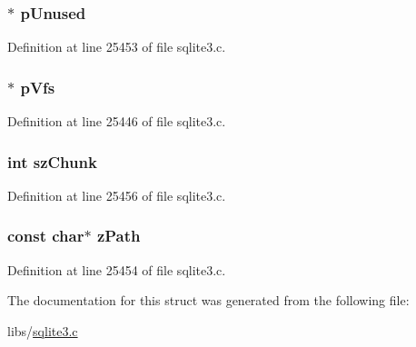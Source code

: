 \subsubsection[{p\+Unused}]{$\ast$ p\+Unused}\label{structunix_file_a7ecad57bed967765906dd7d10af97be1}


Definition at line 25453 of file sqlite3.\+c.

\hypertarget{structunix_file_a59603ca1cedf2bda0ee4e65eb610a0b5}{}
\subsubsection[{p\+Vfs}]{$\ast$ p\+Vfs}\label{structunix_file_a59603ca1cedf2bda0ee4e65eb610a0b5}


Definition at line 25446 of file sqlite3.\+c.

\hypertarget{structunix_file_aec8d343f93783cd4e6a649d4b157ac8c}{}
\subsubsection[{sz\+Chunk}]{\setlength{\rightskip}{0pt plus 5cm}int sz\+Chunk}\label{structunix_file_aec8d343f93783cd4e6a649d4b157ac8c}


Definition at line 25456 of file sqlite3.\+c.

\hypertarget{structunix_file_adfe0c5350fc7ff271fd542aa50bdc259}{}
\subsubsection[{z\+Path}]{\setlength{\rightskip}{0pt plus 5cm}const char$\ast$ z\+Path}\label{structunix_file_adfe0c5350fc7ff271fd542aa50bdc259}


Definition at line 25454 of file sqlite3.\+c.



The documentation for this struct was generated from the following file\+:\begin{DoxyCompactItemize}
\item 
libs/\hyperlink{sqlite3_8c}{sqlite3.\+c}\end{DoxyCompactItemize}

